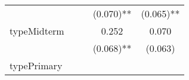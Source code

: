 \documentclass[12pt,twoside]{reedthesis}
\begin{document}
\begin{longtable}[]{@{}lcccc@{}}
\begin{minipage}[t]{0.26\columnwidth}
  \strut
  \end{minipage} & \begin{minipage}[t]{0.12\columnwidth}\centering\strut
  \strut
  \end{minipage} & \begin{minipage}[t]{0.14\columnwidth}\centering\strut
  \strut
  \end{minipage} & \begin{minipage}[t]{0.14\columnwidth}\centering\strut
  (0.070)**\strut
  \end{minipage} & \begin{minipage}[t]{0.14\columnwidth}\centering\strut
  (0.065)**\strut
  \end{minipage}\tabularnewline
  \begin{minipage}[t]{0.26\columnwidth}\raggedright\strut
  typeMidterm\strut
  \end{minipage} & \begin{minipage}[t]{0.12\columnwidth}\centering\strut
  \strut
  \end{minipage} & \begin{minipage}[t]{0.14\columnwidth}\centering\strut
  \strut
  \end{minipage} & \begin{minipage}[t]{0.14\columnwidth}\centering\strut
  0.252\strut
  \end{minipage} & \begin{minipage}[t]{0.14\columnwidth}\centering\strut
  0.070\strut
  \end{minipage}\tabularnewline
  \begin{minipage}[t]{0.26\columnwidth}\raggedright\strut
  \strut
  \end{minipage} & \begin{minipage}[t]{0.12\columnwidth}\centering\strut
  \strut
  \end{minipage} & \begin{minipage}[t]{0.14\columnwidth}\centering\strut
  \strut
  \end{minipage} & \begin{minipage}[t]{0.14\columnwidth}\centering\strut
  (0.068)**\strut
  \end{minipage} & \begin{minipage}[t]{0.14\columnwidth}\centering\strut
  (0.063)\strut
  \end{minipage}\tabularnewline
  \begin{minipage}[t]{0.26\columnwidth}\raggedright\strut
  typePrimary\strut
  \end{minipage} & \begin{minipage}[t]{0.12\columnwidth}\centering\strut

\end{minipage}
\end{longtable}
\end{document}
